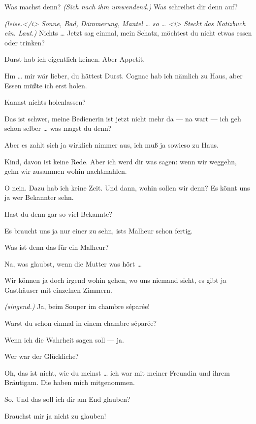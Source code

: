 \documentclass[
	final,
	a4paper,
	ngerman,
	mpinclude = true, %
	twoside = true,
	open = right,
	cleardoublepage = plain,
	DIV = 13,
	BCOR = 1cm,
	titlepage = firstiscover,
	]{scrbook}
\newcommand{\direction}[1]{\textit{(#1)}}
\newcommand{\thecharacter}[1]{\textup{\textsc{#1}}\xspace}
\newcommand{\thesuesse}{\thecharacter{Süßes Mädel}}
\newcommand{\thedichter}{\thecharacter{Dichter}}
\newcommand{\character}[1]{\item[#1:]}
\newcommand{\suesse}{\character{\thesuesse}}
\newcommand{\dichter}{\character{\thedichter}}
\begin{document}
\begin{play}
	\suesse
	Was machst denn? \direction{Sich nach ihm umwendend.} Was schreibst dir denn auf?

	\dichter
	\direction{leise.</i> Sonne, Bad, Dämmerung, Mantel \ldots{} so \ldots{} <i> Steckt das Notizbuch ein. Laut.} Nichts \ldots{} Jetzt sag einmal, mein Schatz, möchtest du nicht etwas essen oder trinken?

	\suesse
	Durst hab ich eigentlich keinen. Aber Appetit.

	\dichter
	Hm \ldots{} mir wär lieber, du hättest Durst. Cognac hab ich nämlich zu Haus, aber Essen müßte ich erst holen.

	\suesse
	Kannst nichts holenlassen?

	\dichter
	Das ist schwer, meine Bedienerin ist jetzt nicht mehr da --- na wart --- ich geh schon selber \ldots{} was magst du denn?

	\suesse
	Aber es zahlt sich ja wirklich nimmer aus, ich muß ja sowieso zu Haus.

	\dichter
	Kind, davon ist keine Rede. Aber ich werd dir was sagen: wenn wir weggehn, gehn wir zusammen wohin nachtmahlen.

	\suesse
	O nein. Dazu hab ich keine Zeit. Und dann, wohin sollen wir denn? Es könnt uns ja wer Bekannter sehn.

	\dichter
	Hast du denn gar so viel Bekannte?

	\suesse
	Es braucht uns ja nur einer zu sehn, ists Malheur schon fertig.

	\dichter
	Was ist denn das für ein Malheur?

	\suesse
	Na, was glaubst, wenn die Mutter was hört \ldots{}

	\dichter
	Wir können ja doch irgend wohin gehen, wo uns niemand sieht, es gibt ja Gasthäuser mit einzelnen Zimmern.

	\suesse
	\direction{singend.} Ja, beim Souper im chambre séparée!

	\dichter
	Warst du schon einmal in einem chambre séparée?

	\suesse
	Wenn ich die Wahrheit sagen soll --- ja.

	\dichter
	Wer war der Glückliche?

	\suesse
	Oh, das ist nicht, wie du meinst \ldots{} ich war mit meiner Freundin und ihrem Bräutigam. Die haben mich mitgenommen.

	\dichter
	So. Und das soll ich dir am End glauben?

	\suesse
	Brauchst mir ja nicht zu glauben!


\end{play}
\end{document}
